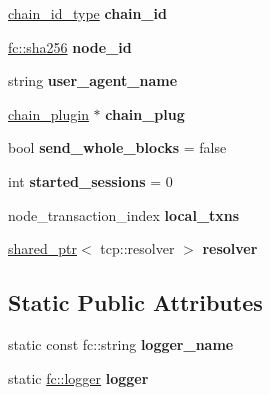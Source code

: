 \begin{DoxyCompactItemize}
\mbox{\hyperlink{classfc_1_1sha256}{chain\+\_\+id\+\_\+type}} {\bfseries chain\+\_\+id}
\item 
\mbox{\label{classaacio_1_1net__plugin__impl_ab390ddf978c7dfe9f2e332b10c9186f7}} 
\mbox{\hyperlink{classfc_1_1sha256}{fc\+::sha256}} {\bfseries node\+\_\+id}
\item 
\mbox{\label{classaacio_1_1net__plugin__impl_a00977fa5b676a77e6cbd7388b85d0cb7}} 
string {\bfseries user\+\_\+agent\+\_\+name}
\item 
\mbox{\label{classaacio_1_1net__plugin__impl_abcd4ebe75fd5d5a81793dff4489780b1}} 
\mbox{\hyperlink{classaacio_1_1chain__plugin}{chain\+\_\+plugin}} $\ast$ {\bfseries chain\+\_\+plug}
\item 
\mbox{\label{classaacio_1_1net__plugin__impl_a6f98668352ee52436cd310bd25e9b6b6}} 
bool {\bfseries send\+\_\+whole\+\_\+blocks} = false
\item 
\mbox{\label{classaacio_1_1net__plugin__impl_a673be9b3debc0d899d8b5424f84d142a}} 
int {\bfseries started\+\_\+sessions} = 0
\item 
\mbox{\label{classaacio_1_1net__plugin__impl_a315c25b0408b027670a0b28d4fc9f411}} 
node\+\_\+transaction\+\_\+index {\bfseries local\+\_\+txns}
\item 
\mbox{\label{classaacio_1_1net__plugin__impl_aabf0d9acbdbbd65aa0de193ef220b577}} 
\mbox{\hyperlink{classfc_1_1shared__ptr}{shared\+\_\+ptr}}$<$ tcp\+::resolver $>$ {\bfseries resolver}
\end{DoxyCompactItemize}
\subsection*{Static Public Attributes}
\begin{DoxyCompactItemize}
\item 
\mbox{\label{classaacio_1_1net__plugin__impl_a32c123894dea8c00086a42e58aa63ba6}} 
static const fc\+::string {\bfseries logger\+\_\+name}
\item 
\mbox{\label{classaacio_1_1net__plugin__impl_a44f4d48c8b03f5e39bb77ef99e79086c}} 
static \mbox{\hyperlink{classfc_1_1logger}{fc\+::logger}} {\bfseries logger}
\end{DoxyCompactItemize}


